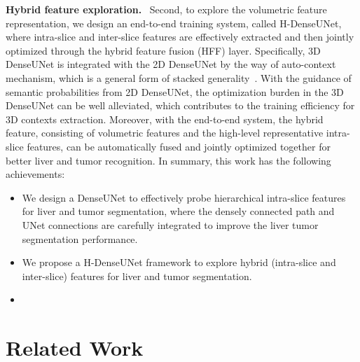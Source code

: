 \documentclass[journal]{IEEEtran}
\begin{document}
\textbf{Hybrid feature exploration.} \
Second, to explore the volumetric feature representation, we design an end-to-end training system, called H-DenseUNet, where intra-slice and inter-slice features are effectively extracted and then jointly optimized through the hybrid feature fusion (HFF) layer.  
Specifically, 3D DenseUNet is integrated with the 2D DenseUNet by the way of auto-context~\citep{tu2008auto} mechanism, which is a general form of stacked generality~\citep{wolpert1992stacked}.
With the guidance of semantic probabilities from 2D DenseUNet, the optimization burden in the 3D DenseUNet can be well alleviated, which contributes to the training efficiency for 3D contexts extraction.
Moreover, with the end-to-end system, the hybrid feature, consisting of volumetric features and the high-level representative intra-slice features, can be automatically fused and jointly optimized together for better liver and tumor recognition.
In summary, this work has the following achievements:
\begin{itemize}
	\item We design a DenseUNet to effectively probe hierarchical intra-slice features for liver and tumor segmentation, where the densely connected path and UNet connections are carefully integrated  to improve the liver tumor segmentation performance.


	\item We propose a H-DenseUNet framework to explore hybrid (intra-slice and inter-slice) features for liver and tumor segmentation. 
	
	\item 
{}
\end{itemize}






\section{Related Work}
\end{document}
